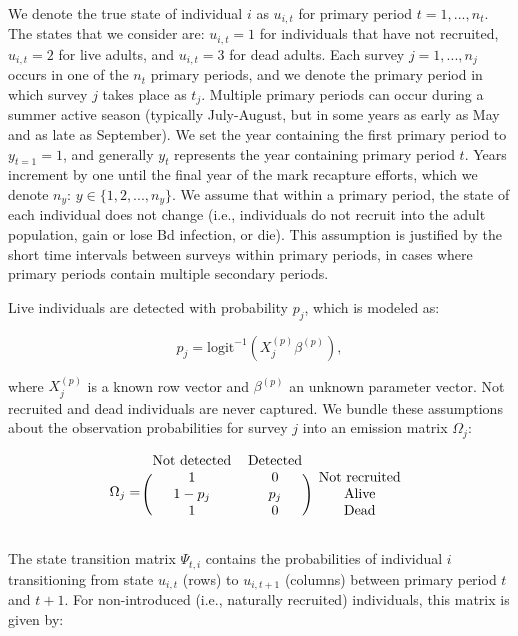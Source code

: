 \documentclass[9pt,twoside,lineno]{pnas-new-SI}
\begin{document}
We denote the true state of individual \(i\) as \(u_{i, t}\) for primary
period \(t = 1,..., n_t\). The states that we consider are:
\(u_{i, t} = 1\) for individuals that have not recruited,
\(u_{i, t} =2\) for live adults, and \(u_{i, t} = 3\) for dead adults.
Each survey \(j=1, ..., n_j\) occurs in one of the \(n_t\) primary
periods, and we denote the primary period in which survey \(j\) takes
place as \(t_j\). Multiple primary periods can occur during a summer
active season (typically July-August, but in some years as early as May
and as late as September). We set the year containing the first primary
period to \(y_{t = 1} = 1\), and generally \(y_t\) represents the year
containing primary period \(t\). Years increment by one until the final
year of the mark recapture efforts, which we denote \(n_y\):
\(y \in \{1, 2, ..., n_y\}\). We assume that within a primary period,
the state of each individual does not change (i.e., individuals do not
recruit into the adult population, gain or lose Bd infection, or die).
This assumption is justified by the short time intervals between surveys
within primary periods, in cases where primary periods contain multiple
secondary periods.

Live individuals are detected with probability \(p_j\), which is modeled
as:

\[p_j = \text{logit}^{-1}(X_j^{(p)} \beta^{(p)}),\]

where \(X_j^{(p)}\) is a known row vector and \(\beta^{(p)}\) an unknown
parameter vector. Not recruited and dead individuals are never captured.
We bundle these assumptions about the observation probabilities for
survey \(j\) into an emission matrix \(\Omega_j\):

\[
\Omega_j =
\begin{blockarray}{ccc}
  \text{Not detected} & \text{Detected} \\
\begin{block}{(cc)c}
  1 & 0 & \text{Not recruited} \\
  1 - p_j & p_j & \text{Alive} \\
  1 & 0 & \text{Dead} \\
\end{block}
\end{blockarray}
\]

The state transition matrix \(\Psi_{t, i}\) contains the probabilities
of individual \(i\) transitioning from state \(u_{i, t}\) (rows) to
\(u_{i, t+1}\) (columns) between primary period \(t\) and \(t+1\). For
non-introduced (i.e., naturally recruited) individuals, this matrix is
given by:
\end{document}
